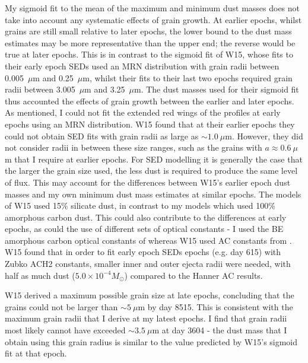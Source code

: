 My sigmoid fit to the mean of the maximum and 
minimum dust masses does not take into account any systematic effects of 
grain growth.  At earlier epochs, whilst grains are 
still small relative to later epochs, the lower bound to the dust mass 
estimates may be more representative than the upper end; the reverse would 
be true at later epochs.
This is in contrast to the sigmoid fit of W15, whose fits to their early 
epoch SEDs used an MRN distribution with grain radii between 0.005~$\mu$m 
and 0.25~$\mu$m, whilst their fits to their last two epochs required grain 
radii between 3.005~$\mu$m and 3.25~$\mu$m. The dust masses used for their 
sigmoid fit thus accounted the effects of grain growth between the earlier 
and later epochs. As mentioned, I could not fit the extended red wings of 
the profiles at early epochs using an MRN distribution.  W15 found that at 
their earlier epochs they could not obtain SED fits with grain radii as 
large as $\sim 1.0~\mu$m. However, they did not consider radii in between 
these size ranges, such as the grains with $a \approx 0.6~\mu$m that I 
require at earlier epochs.  For SED modelling it is generally the case that 
the larger the grain size used, the less dust is required to produce the 
same level of flux.  This may account for the differences between W15's 
earlier epoch dust masses and my own minimum dust mass estimates at 
similar epochs.  The models of W15 used 15\% silicate dust, in contrast to 
my models which used 100\% amorphous carbon dust.  This could also 
contribute to the differences at early epochs, as could the use of 
different sets of optical constants - I used the BE amorphous carbon 
optical constants of \citet{Zubko1996} whereas W15 used AC constants from 
\citet{Hanner1988}.  W15 found that in order to fit early epoch SEDs epochs 
(e.g. day 615) with Zubko ACH2 constants, smaller inner and outer ejecta 
radii were needed, with half as much dust ($5.0 \times 10^{-4}M_{\odot}$) 
compared to the Hanner AC results.

W15 derived a maximum possible grain size at late epochs, concluding that 
the grains could not be larger than $\sim 5~\mu$m by day 8515. This is 
consistent with the maximum grain radii that I derive at my latest 
epochs.  I find that grain radii most likely cannot have exceeded $\sim 
3.5~\mu$m at day 3604 - the dust mass that I obtain using this grain 
radius is similar to the value predicted by W15's sigmoid fit at that 
epoch.


